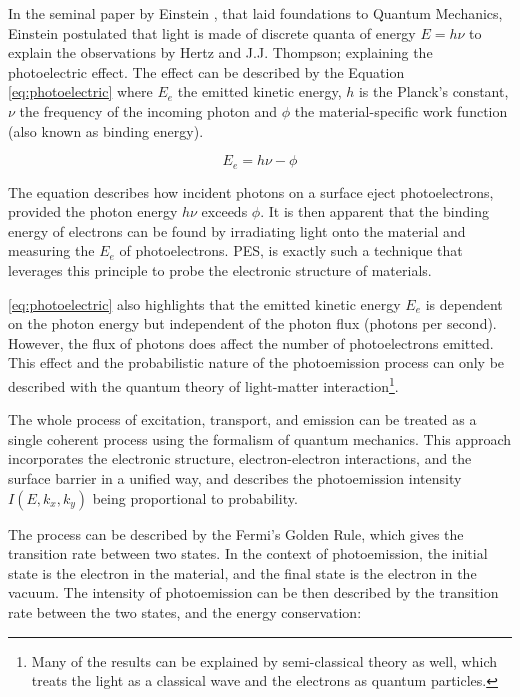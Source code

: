 In the seminal paper by Einstein \cite{einsteinUberErzeugungUnd1905}, that laid foundations to Quantum Mechanics, Einstein postulated that light is made of discrete quanta of energy $E = h\nu$ to explain the observations by Hertz and J.J. Thompson; explaining the photoelectric effect. The effect can be described by the Equation \ref{eq:photoelectric} where $E_e$ the emitted kinetic energy, $h$ is the Planck's constant, $\nu$ the frequency of the incoming photon and  $\phi$ the material-specific work function (also known as binding energy). 

\begin{equation}\label{eq:photoelectric}
    E_e = h\nu - \phi
\end{equation}

The equation describes how incident photons on a surface eject photoelectrons, provided the photon energy $h\nu$ exceeds $\phi$.
It is then apparent that the binding energy of electrons can be found by irradiating light onto the material and measuring the $E_e$ of photoelectrons. \Gls{PES}, is exactly such a technique that leverages this principle to probe the electronic structure of materials.

\cref{eq:photoelectric} also highlights that the emitted kinetic energy $E_e$ is dependent on the photon energy but independent of the photon flux (photons per second). However, the flux of photons does affect the number of photoelectrons emitted. This effect and the probabilistic nature of the photoemission process can only be described with the quantum theory of light-matter interaction\footnote{Many of the results can be explained by semi-classical theory as well, which treats the light as a classical wave and the electrons as quantum particles.}.

The whole process of excitation, transport, and emission can be treated as a single coherent process using the formalism of quantum mechanics. This approach incorporates the electronic structure, electron-electron interactions, and the surface barrier in a unified way, and describes the photoemission intensity  $I(E, k_x, k_y)$ being proportional to probability.

The process can be described by the Fermi's Golden Rule, which gives the transition rate between two states. In the context of photoemission, the initial state is the electron in the material, and the final state is the electron in the vacuum. The intensity of photoemission can be then described by the transition rate between the two states, and the energy conservation:


